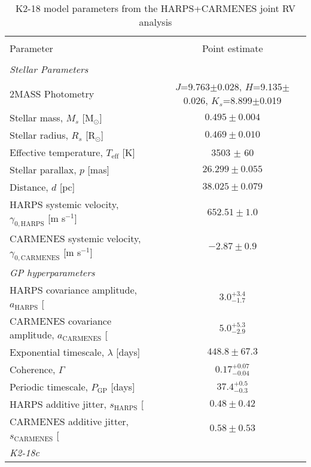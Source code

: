 \begin{table*}
\small
\renewcommand{\arraystretch}{0.7}
\centering
\caption[]{K2-18 model parameters from the HARPS+CARMENES joint RV analysis}
\label{k2182table:k218}
\begin{tabular}{lc}
\hline \\ [-1ex]
Parameter & Point estimate \smallskip\\
\hline \\ [-1ex]
\emph{Stellar Parameters} & \smallskip \\
2MASS Photometry & $J$=9.763$\pm$0.028, $H$=9.135$\pm$0.026, $K_s$=8.899$\pm$0.019 \\
Stellar mass, $M_s$ [M$_{\odot}$]  &  $0.495\pm 0.004$ \\
Stellar radius, $R_s$ [R$_{\odot}$]  &  $0.469\pm 0.010$  \\
Effective temperature, $T_{\text{eff}}$ [K]  & 3503 $\pm$ 60 \\
Stellar parallax, $p$ [mas] & $26.299\pm 0.055$ \\
Distance, $d$ [pc] & $38.025 \pm 0.079$ \\
HARPS systemic velocity, $\gamma_{0,\text{HARPS}}$ [m s$^{-1}$] & $652.51 \pm 1.0$ \\
CARMENES systemic velocity, $\gamma_{0,\text{CARMENES}}$ [m s$^{-1}$] & $-2.87\pm 0.9$ \medskip \\
\emph{GP hyperparameters} & \smallskip \\
HARPS covariance amplitude, $a_{\text{HARPS}}$ [\mps{]} & $3.0^{+3.4}_{-1.7}$  \\
CARMENES covariance amplitude, $a_{\text{CARMENES}}$ [\mps{]} & $5.0^{+5.3}_{-2.9}$ \\
Exponential timescale, $\lambda$ [days] &  $448.8\pm 67.3$ \\
Coherence, $\Gamma$ &  $0.17^{+0.07}_{-0.04}$ \\
Periodic timescale, $P_{\text{GP}}$ [days] & $37.4^{+0.5}_{-0.3}$ \\
HARPS additive jitter, $s_{\text{HARPS}}$ [\mps{]} & $0.48\pm 0.42$ \\
CARMENES additive jitter, $s_{\text{CARMENES}}$ [\mps{]} & $0.58\pm 0.53$ \medskip \\
\emph{K2-18c} & \smallskip \\

\end{tabular}
\end{table*}
